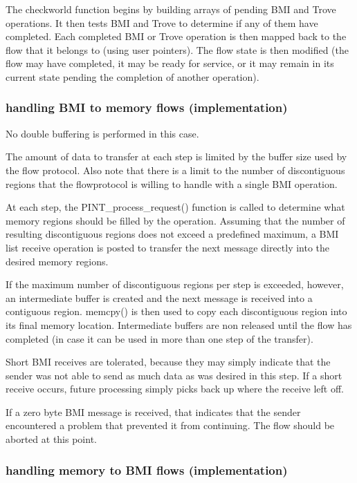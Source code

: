 \documentclass[12pt]{article} %
\begin{document}
The checkworld function begins by building arrays of pending BMI
and Trove operations.  It then tests BMI and Trove to determine if
any of them have completed.  Each completed BMI or Trove operation
is then mapped back to the flow that it belongs to (using user
pointers).  The flow state is then modified (the flow may have
completed, it may be ready for service, or it may remain in its
current state pending the completion of another operation).

\subsubsection{handling BMI to memory flows (implementation)}

No double buffering is performed in this case.  

The amount of data to transfer at each step is limited by the buffer
size used by the flow protocol.  Also note that there is a limit to
the number of discontiguous regions that the flowprotocol is willing to
handle with a single BMI operation.

At each step, the PINT\_process\_request() function is called to determine
what memory regions should be filled by the operation.  Assuming
that the number of resulting discontiguous regions does not exceed
a predefined maximum, a BMI list receive operation is posted to
transfer the next message directly into the desired memory
regions.

If the maximum number of discontiguous regions per step is
exceeded, however, an intermediate buffer is created and the next
message is received into a contiguous region.  memcpy() is then
used to copy each discontiguous region into its final memory
location.  Intermediate buffers are non released until the flow
has completed (in case it can be used in more than one step of the
transfer).

Short BMI receives are tolerated, because they may simply indicate
that the sender was not able to send as much data as was desired
in this step.  If a short receive occurs, future processing simply picks
back up where the receive left off.

If a zero byte BMI message is received, that indicates that the
sender encountered a problem that prevented it from continuing.
The flow should be aborted at this point.

\subsubsection{handling memory to BMI flows (implementation)}
\end{document}
